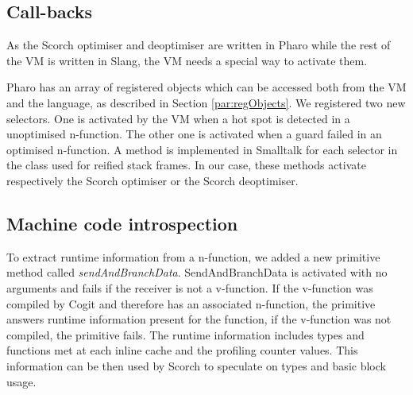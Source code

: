\documentclass[a4paper,12pt,twoside]{../includes/ThesisStyle}
\begin{document}

\subsection{Call-backs}

As the Scorch optimiser and deoptimiser are written in Pharo while the rest of the VM is written in Slang, the VM needs a special way to activate them. 

Pharo has an array of registered objects which can be accessed both from the VM and the language, as described in Section \ref{par:regObjects}. We registered two new selectors. One is activated by the VM when a hot spot is detected in a unoptimised n-function. The other one is activated when a guard failed in an optimised n-function. A method is implemented in Smalltalk for each selector in the class used for reified stack frames. In our case, these methods activate respectively the Scorch optimiser or the Scorch deoptimiser.

\subsection{Machine code introspection}

To extract runtime information from a n-function, we added a new primitive method called \emph{sendAndBranchData}. SendAndBranchData is activated with no arguments and fails if the receiver is not a v-function. If the v-function was compiled by Cogit and therefore has an associated n-function, the primitive answers runtime information present for the function, if the v-function was not compiled, the primitive fails. The runtime information includes types and functions met at each inline cache and the profiling counter values. This information can be then used by Scorch to speculate on types and basic block usage. 
\end{document}
